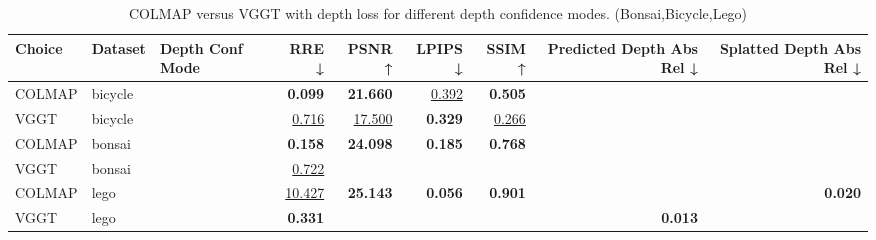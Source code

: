 \begin{table}[H]
\caption{COLMAP versus VGGT with depth loss for different depth confidence modes. (Bonsai,Bicycle,Lego)}
\label{tab:05_depth_conf_mode_bonsai,bicycle,lego}
\small
\begin{tabular}{lllrrrrrr}
\toprule
Choice & Dataset & Depth Conf Mode & RRE ↓ & PSNR ↑ & LPIPS ↓ & SSIM ↑ & Predicted Depth Abs Rel ↓ & Splatted Depth Abs Rel ↓ \\
\midrule
COLMAP & bicycle &  & \textbf{0.099} & \textbf{21.660} & \underline{0.392} & \textbf{0.505} &  &  \\
VGGT & bicycle &  & \underline{0.716} & \underline{17.500} & \textbf{0.329} & \underline{0.266} &  &  \\
\midrule
COLMAP & bonsai &  & \textbf{0.158} & \textbf{24.098} & \textbf{0.185} & \textbf{0.768} &  &  \\
VGGT & bonsai &  & \underline{0.722} &  &  &  &  &  \\
\midrule
COLMAP & lego &  & \underline{10.427} & \textbf{25.143} & \textbf{0.056} & \textbf{0.901} &  & \textbf{0.020} \\
VGGT & lego &  & \textbf{0.331} &  &  &  & \textbf{0.013} &  \\
\bottomrule
\end{tabular}
\end{table}
